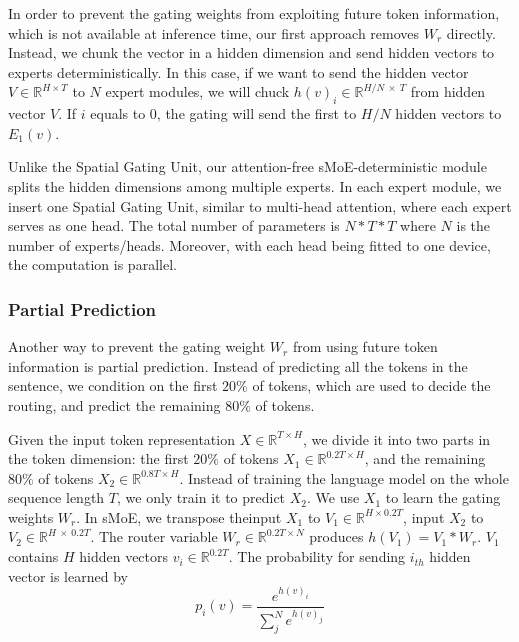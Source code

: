 \documentclass{article}
\begin{document}
In order to prevent the gating weights from exploiting future token information, which is not available at inference time, our first approach removes $W_r$ directly. Instead, we chunk the vector in a hidden dimension and send hidden vectors to experts deterministically. In this case, if we want to send the hidden vector $V \in \mathbb{R}^{H\times T}$ to $N$ expert modules, we will chuck $h(v)_i \in \mathbb{R}^{H/N\ \times\ T}$ from hidden vector $V$. If $i$ equals to $0$, the gating will send the first to $H/N$ hidden vectors to $E_1(v)$. 





Unlike the Spatial Gating Unit, our attention-free sMoE-deterministic module splits the hidden dimensions among multiple experts. In each expert module, we insert one Spatial Gating Unit, similar to multi-head attention, where each expert serves as one head. The total number of parameters is $N*T*T$ where  $N$ is the number of experts/heads. Moreover, with each head being fitted to one device, the computation is parallel. 




\subsubsection{Partial Prediction}
\label{sec:partial_prediction}

Another way to prevent the gating weight $W_r$ from using future token information is partial prediction. Instead of predicting all the tokens in the sentence, we condition on the first $20\%$ of tokens, which are used to decide the routing, and predict the remaining $80\%$ of tokens. 

Given the input token representation $X \in \mathbb{R}^{T\times H}$, we divide it into two parts in the token dimension: the first $20\%$ of tokens $X_1 \in \mathbb{R}^{0.2T \times H}$, and the remaining $80\%$ of tokens $X_2 \in \mathbb{R}^{0.8T \times  H}$. Instead of training the language model on the whole sequence length $T$, we only train it to predict $X_2$. We use $X_1$ to learn the gating weights $W_r$. In sMoE, we transpose theinput $X_1$ to $V_1 \in \mathbb{R}^{H \times 0.2T}$, input $X_2$ to $V_2 \in \mathbb{R}^{H\ \times\ 0.2T}$. The router variable $W_r \in \mathbb{R}^{0.2T \times N}$ produces $h(V_1) = V_1 * W_r$. $V_1$ contains $H$ hidden vectors $v_i \in \mathbb{R}^{0.2T}$. The probability for sending $i_{th}$ hidden vector is learned by
\begin{equation}
    p_i(v) = \frac{e^{h(v)_i}}{\sum_j^N e^{h(v)_j}}
\end{equation}
\end{document}
